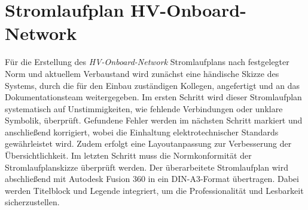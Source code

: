 % 
\addtocounter{page}{1} 
\section*{Stromlaufplan HV-Onboard-Network}
Für die Erstellung des \textit{HV-Onboard-Network} Stromlaufplans nach festgelegter Norm und aktuellem Verbaustand wird zunächst eine händische Skizze des Systems, durch die für den Einbau zuständigen Kollegen, angefertigt und an das Dokumentationsteam weitergegeben. Im ersten Schritt wird dieser Stromlaufplan systematisch auf Unstimmigkeiten, wie fehlende Verbindungen oder unklare Symbolik, überprüft. Gefundene Fehler werden im nächsten Schritt markiert und anschließend korrigiert, wobei die Einhaltung elektrotechnischer Standards gewährleistet wird. Zudem erfolgt eine Layoutanpassung zur Verbesserung der Übersichtlichkeit. Im letzten Schritt muss die Normkonformität der Stromlaufplanskizze überprüft werden. Der überarbeitete Stromlaufplan wird abschließend mit Autodesk Fusion 360 in ein DIN-A3-Format übertragen. Dabei werden Titelblock und Legende integriert, um die Professionalität und Lesbarkeit sicherzustellen. 

 
\addtocounter{page}{1} 

